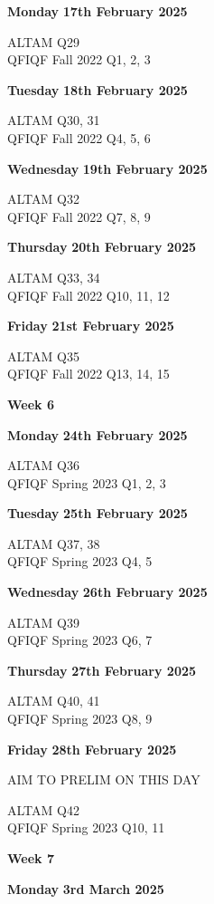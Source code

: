\documentclass[hidelinks, 12pt]{article}
\theoremstyle{mydefstyle}
\theoremstyle{mythmstyle}
\begin{document}
\textbf{Monday} \hfill \textbf{17th February 2025}

ALTAM Q29 \\
QFIQF Fall 2022 Q1, 2, 3

\textbf{Tuesday} \hfill \textbf{18th February 2025}

ALTAM Q30, 31 \\
QFIQF Fall 2022 Q4, 5, 6

\textbf{Wednesday} \hfill \textbf{19th February 2025}

ALTAM Q32 \\
QFIQF Fall 2022 Q7, 8, 9

\textbf{Thursday} \hfill \textbf{20th February 2025}

ALTAM Q33, 34 \\
QFIQF Fall 2022 Q10, 11, 12

\textbf{Friday} \hfill \textbf{21st February 2025}

ALTAM Q35 \\
QFIQF Fall 2022 Q13, 14, 15

\begin{center}
\textbf{Week 6}
\end{center}

\textbf{Monday} \hfill \textbf{24th February 2025}

ALTAM Q36 \\
QFIQF Spring 2023 Q1, 2, 3

\textbf{Tuesday} \hfill \textbf{25th February 2025}

ALTAM Q37, 38 \\
QFIQF Spring 2023 Q4, 5

\textbf{Wednesday} \hfill \textbf{26th February 2025}

ALTAM Q39 \\
QFIQF Spring 2023 Q6, 7

\textbf{Thursday} \hfill \textbf{27th February 2025}

ALTAM Q40, 41 \\
QFIQF Spring 2023 Q8, 9

\textbf{Friday} \hfill \textbf{28th February 2025}

AIM TO PRELIM ON THIS DAY

ALTAM Q42 \\
QFIQF Spring 2023 Q10, 11

\begin{center}
\textbf{Week 7}
\end{center}

\textbf{Monday} \hfill \textbf{3rd March 2025}
\end{document}
